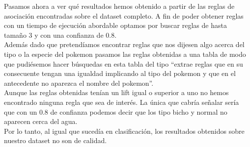 Pasamos ahora a ver qué resultados hemos obtenido a partir de las reglas de asociación encontradas sobre el dataset completo. A fin de poder obtener reglas con un tiempo de ejecución abordable optamos por buscar reglas de hasta tamaño 3 y con una confianza de 0.8.\\

Además dado que pretendíamos encontrar reglas que nos dijesen algo acerca del tipo o la especie del pokemon pasamos las reglas obtenidas a una tabla de modo que pudiésemos hacer búsquedas en esta tabla del tipo ``extrae reglas que en su consecuente tengan una igualdad implicando al tipo del pokemon y que en el antecedente no aparezca el nombre del pokemon''.\\

Aunque las reglas obtenidas tenían un lift igual o superior a uno no hemos encontrado ninguna regla que sea de interés. La única que cabría señalar sería que con un 0.8 de confianza podemos decir que los tipo bicho y normal no aparecen cerca del agua.\\

Por lo tanto, al igual que sucedía en clasificación, los resultados obtenidos sobre nuestro dataset no son de calidad.